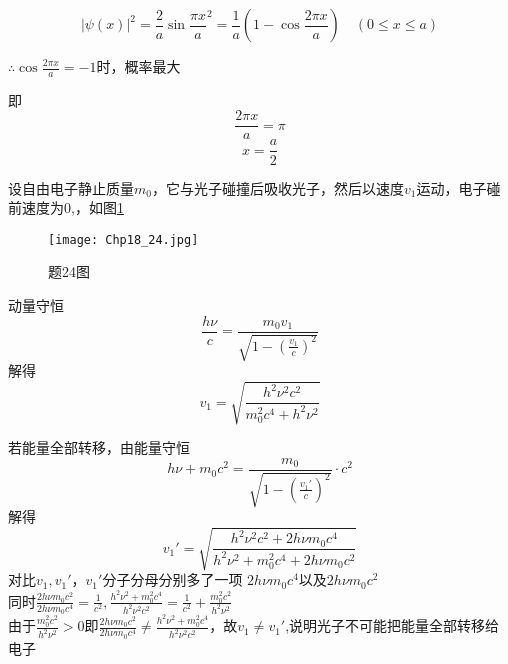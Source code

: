 \exercise

\solve 
\[ |\psi(x)|^2=\frac{2}{a}\sin{\frac{\pi x}{a}}^2=\frac{1}{a}(1-\cos{\frac{2\pi x}{a}}) \quad (0\le x \le a) \]

$\therefore \cos{\frac{2\pi x}{a}}=-1$时，概率最大

即
\[ \frac{2\pi x}{a}=\pi \]
\[ x=\frac{a}{2} \]
	
\exercise

\solve 设自由电子静止质量$m_0$，它与光子碰撞后吸收光子，然后以速度$v_1$运动，电子碰前速度为0,，如图\ref{24}

\begin{figure}[htbp]
	\centering
	\texttt{[image: Chp18\_24.jpg]}
	\caption{题24图}
	\label{24}
\end{figure}

动量守恒
\[ \frac{h\nu}{c}=\frac{m_0v_1}{\sqrt{1-\left(\frac{v_1}{c}\right)^2}} \]
解得
\[ v_1=\sqrt{\frac{h^2\nu^2c^2}{m_0^2c^4+h^2\nu^2}} \]

若能量全部转移，由能量守恒
\[ h\nu+m_0c^2=\frac{m_0}{\sqrt{1-\left(\frac{v_1'}{c}\right)^2}}\cdot c^2 \]
解得
\[v_1'=\sqrt{\frac{h^2\nu^2c^2+2h\nu m_0c^4}{{h^2\nu^2+m_0^2c^4+2h\nu m_0c^2}}}  \]
对比$v_1,v_1'$，$v_1'$分子分母分别多了一项 $2h\nu m_0c^4$以及$2h\nu m_0c^2$\\同时$\frac{2h\nu m_0c^2}{2h\nu m_0c^4}=\frac{1}{c^2},\frac{h^2\nu^2+m_0^2c^4}{h^2\nu^2c^2}=\frac{1}{c^2}+\frac{m_0^2c^2}{h^2\nu^2}$\\
由于$\frac{m_0^2c^2}{h^2\nu^2}>0$即$\frac{2h\nu m_0c^2}{2h\nu m_0c^4}\neq\frac{h^2\nu^2+m_0^2c^4}{h^2\nu^2c^2}$，故$v_1\neq v_1'$,说明光子不可能把能量全部转移给电子